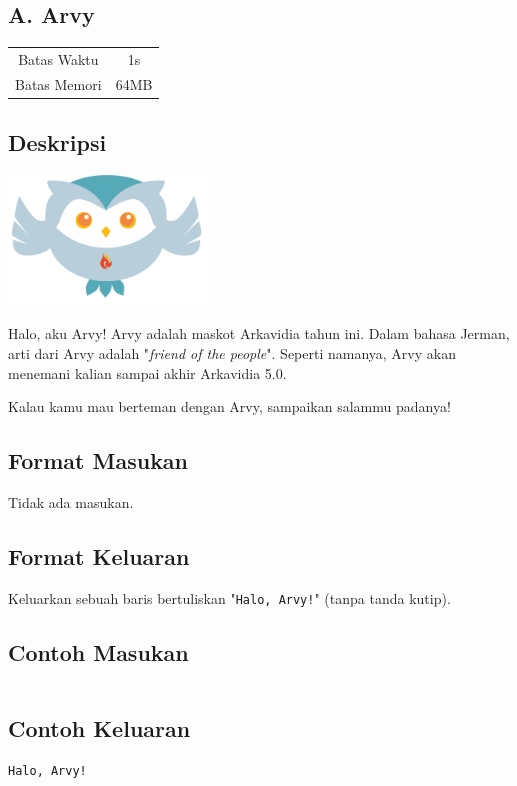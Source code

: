 \documentclass{article}
\begin{document}
\begin{center}
    \section*{A. Arvy}

    \begin{tabular}{ | c c | }
        \hline
        Batas Waktu  & 1s \\
        Batas Memori & 64MB \\
        \hline
    \end{tabular}
\end{center}

\subsection*{Deskripsi}

\begin{center}
\includegraphics[width=200px]{arvy}
\end{center}

Halo, aku Arvy!
Arvy adalah maskot Arkavidia tahun ini.
Dalam bahasa Jerman, arti dari Arvy adalah "\textit{friend of the people}".
Seperti namanya, Arvy akan menemani kalian sampai akhir Arkavidia 5.0.

Kalau kamu mau berteman dengan Arvy, sampaikan salammu padanya!

\subsection*{Format Masukan}

Tidak ada masukan.

\subsection*{Format Keluaran}

Keluarkan sebuah baris bertuliskan "\lstinline{Halo, Arvy!}" (tanpa tanda kutip).
\\

\begin{multicols}{2}
\subsection*{Contoh Masukan}
\begin{lstlisting}

\end{lstlisting}
\columnbreak
\subsection*{Contoh Keluaran}
\begin{lstlisting}
Halo, Arvy!
\end{lstlisting}
\vfill
\null
\end{multicols}


\pagebreak
\end{document}
